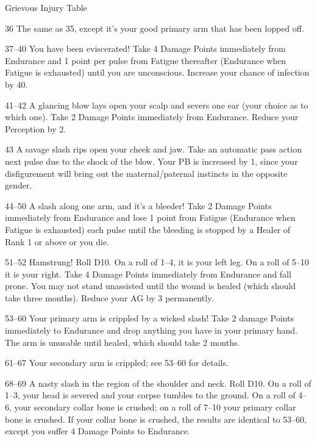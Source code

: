 \begin{Chapter}{Grievous Injury Table}
\begin{Description}
\item[36] The same as 35, except it’s your good primary arm that has
  been lopped off.

\item[37–40] You have been eviscerated! Take 4 Damage Points
  immediately from Endurance and 1 point per pulse from Fatigue
  thereafter (Endurance when Fatigue is exhausted) until you are
  unconscious. Increase your chance of infection by 40.

\item[41–42] A glancing blow lays open your scalp and severs one ear
  (your choice as to which one). Take 2 Damage Points immediately from
  Endurance. Reduce your Perception by 2.

\item[43] A savage slash rips open your cheek and jaw. Take an
  automatic pass action next pulse due to the shock of the blow. Your
  PB is increased by 1, since your disfigurement will bring out the
  maternal/paternal instincts in the opposite gender.

\item[44–50] A slash along one arm, and it’s a bleeder!  Take 2 Damage
  Points immediately from Endurance and lose 1 point from Fatigue
  (Endurance when Fatigue is exhausted) each pulse until the bleeding
  is stopped by a Healer of Rank 1 or above or you die.

\item[51–52] Hamstrung! Roll D10. On a roll of 1–4, it is your left
  leg. On a roll of 5–10 it is your right. Take 4 Damage Points
  immediately from Endurance and fall prone. You may not stand
  unassisted until the wound is healed (which should take three
  months).  Reduce your AG by 3 permanently.

\item[53–60] Your primary arm is crippled by a wicked slash! Take 2
  damage Points immediately to Endurance and drop anything you have in
  your primary hand. The arm is unusable until healed, which should
  take 2 months.

\item[61–67] Your secondary arm is crippled; see 53–60 for details.

\item[68–69] A nasty slash in the region of the shoulder and
  neck. Roll D10. On a roll of 1–3, your head is severed and your
  corpse tumbles to the ground. On a roll of 4–6, your secondary
  collar bone is crushed; on a roll of 7–10 your primary collar bone
  is crushed. If your collar bone is crushed, the results are
  identical to 53–60, except you suffer 4 Damage Points to Endurance.


\end{Description}
\end{Chapter}
